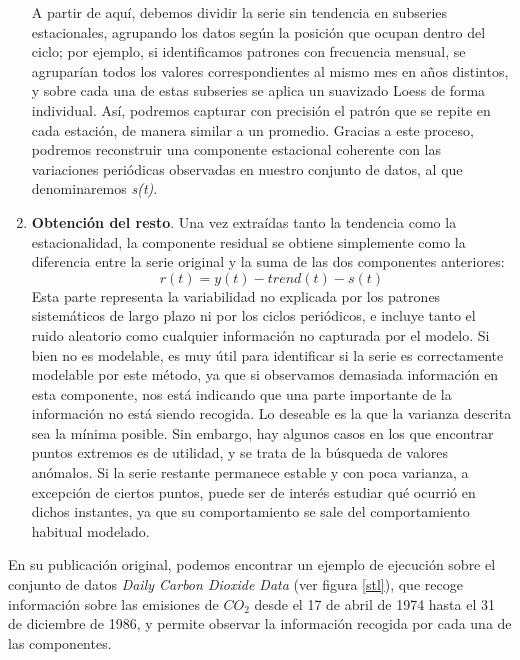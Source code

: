 \begin{enumerate}
	A partir de aquí, debemos dividir la serie sin tendencia en subseries estacionales, agrupando los datos según la posición que ocupan dentro del ciclo; por ejemplo, si identificamos patrones con frecuencia mensual, se agruparían todos los valores correspondientes al mismo mes en años distintos, y sobre cada una de estas subseries se aplica un suavizado Loess de forma individual. Así, podremos capturar con precisión el patrón que se repite en cada estación, de manera similar a un promedio. Gracias a este proceso, podremos reconstruir una componente estacional coherente con las variaciones periódicas observadas en nuestro conjunto de datos, al que denominaremos \textit{s(t)}.
	
	\item \textbf{Obtención del resto}. Una vez extraídas tanto la tendencia como la estacionalidad, la componente residual se obtiene simplemente como la diferencia entre la serie original y la suma de las dos componentes anteriores:
	$$r(t) = y(t) - trend(t) - s(t)$$
	 Esta parte representa la variabilidad no explicada por los patrones sistemáticos de largo plazo ni por los ciclos periódicos, e incluye tanto el ruido aleatorio como cualquier información no capturada por el modelo. Si bien no es modelable, es muy útil para identificar si la serie es correctamente modelable por este método, ya que si observamos demasiada información en esta componente, nos está indicando que una parte importante de la información no está siendo recogida. Lo deseable es la que la varianza descrita sea la mínima posible. Sin embargo, hay algunos casos en los que encontrar puntos extremos es de utilidad, y se trata de la búsqueda de valores anómalos. Si la serie restante permanece estable y con poca varianza, a excepción de ciertos puntos, puede ser de interés estudiar qué ocurrió en dichos instantes, ya que su comportamiento se sale del comportamiento habitual modelado.
\end{enumerate}

En su publicación original, podemos encontrar un ejemplo de ejecución sobre el conjunto de datos \textit{Daily Carbon Dioxide Data} (ver figura \ref{stl}), que recoge información sobre las emisiones de $CO_2$ desde el 17 de abril de 1974 hasta el 31 de diciembre de 1986, y permite observar la información recogida por cada una de las componentes.

